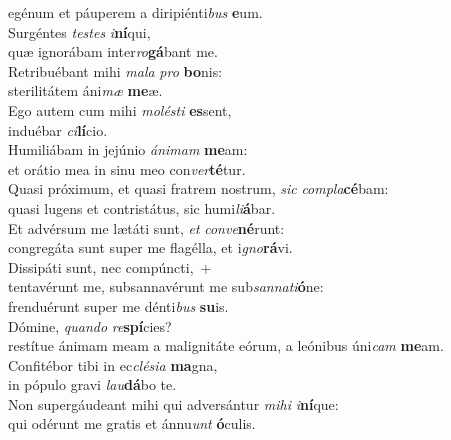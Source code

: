 \evenverse egénum et páuperem a diripiénti\textit{bus} \textbf{e}um.\\
\oddverse Surgéntes \textit{te}\textit{stes} \textit{i}\textbf{ní}qui,~\*\\
\oddverse quæ ignorábam inter\textit{ro}\textbf{gá}bant me.\\
\evenverse Retribuébant mihi \textit{ma}\textit{la} \textit{pro} \textbf{bo}nis:~\*\\
\evenverse sterilitátem áni\textit{mæ} \textbf{me}æ.\\
\oddverse Ego autem cum mihi \textit{mo}\textit{lé}\textit{sti} \textbf{es}sent,~\*\\
\oddverse induébar \textit{ci}\textbf{lí}cio.\\
\evenverse Humiliábam in jejúnio \textit{á}\textit{ni}\textit{mam} \textbf{me}am:~\*\\
\evenverse et orátio mea in sinu meo con\textit{ver}\textbf{té}tur.\\
\oddverse Quasi próximum, et quasi fratrem nostrum, \textit{sic} \textit{com}\textit{pla}\textbf{cé}bam:~\*\\
\oddverse quasi lugens et contristátus, sic humi\textit{li}\textbf{á}bar.\\
\evenverse Et advérsum me lætáti sunt, \textit{et} \textit{con}\textit{ve}\textbf{né}runt:~\*\\
\evenverse congregáta sunt super me flagélla, et i\textit{gno}\textbf{rá}vi.\\
\oddverse Dissipáti sunt, nec compúncti,~+\\
\oddverse  tentavérunt me, subsannavérunt me sub\textit{san}\textit{na}\textit{ti}\textbf{ó}ne:~\*\\
\oddverse frenduérunt super me dénti\textit{bus} \textbf{su}is.\\
\evenverse Dómine, \textit{quan}\textit{do} \textit{re}\textbf{spí}cies?~\*\\
\evenverse restítue ánimam meam a malignitáte eórum, a leónibus úni\textit{cam} \textbf{me}am.\\
\oddverse Confitébor tibi in ec\textit{clé}\textit{si}\textit{a} \textbf{ma}gna,~\*\\
\oddverse in pópulo gravi \textit{lau}\textbf{dá}bo te.\\
\evenverse Non supergáudeant mihi qui adversántur \textit{mi}\textit{hi} \textit{i}\textbf{ní}que:~\*\\
\evenverse qui odérunt me gratis et ánnu\textit{unt} \textbf{ó}culis.\\
